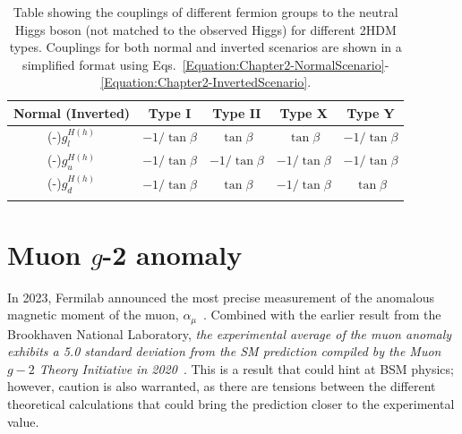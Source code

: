 \begin{table}[h]
\centering
\renewcommand{\arraystretch}{1.5} %
\setlength{\tabcolsep}{12pt} %
\begin{tabular}{|c|c|c|c|c|}
\hline
Normal (Inverted)     & Type I                     & Type II                     & Type X                                        & Type Y                      \\ \hline \hline
(-)$g_l^{H(h)}$ & $-1/\tan{\beta}$  & $\tan{\beta}$  & $\tan{\beta}$                    & $-1/\tan{\beta}$  \\ \arrayrulecolor{lightgray} \hline
(-)$g_u^{H(h)}$ & $-1/\tan{\beta}$  & $-1/\tan{\beta}$  & $-1/\tan{\beta}$                    & $-1/\tan{\beta}$  \\ \arrayrulecolor{lightgray} \hline
(-)$g_d^{H(h)}$ & $-1/\tan{\beta}$  & $\tan{\beta}$  & $-1/\tan{\beta}$                    & $\tan{\beta}$  \\ \arrayrulecolor{black} \hline
\end{tabular}
\caption[Neutral Higgs–fermion couplings for different 2HDM types]{Table showing the couplings of different fermion groups to the neutral Higgs boson (not matched to the observed Higgs) for different 2HDM types. Couplings for both normal and inverted scenarios are shown in a simplified format using Eqs.~\ref{Equation:Chapter2-NormalScenario}-\ref{Equation:Chapter2-InvertedScenario}.}
\label{Table:Chapter2_2HDM-CouplingsAlignmentLimit}
\end{table}

\section{\texorpdfstring{Muon $g$-2 anomaly}{Muon g-2 anomaly}}

In 2023, Fermilab announced the most precise measurement of the anomalous magnetic moment of the muon, $\alpha_\mu$~\cite{Fermilab_g-2}. Combined with the earlier result from the Brookhaven National Laboratory, \textit{the experimental average of the muon anomaly exhibits a 5.0 standard deviation from the SM prediction compiled by the Muon $g-2$ Theory Initiative in 2020}~\cite{Muon_Theory_Initiative}. This is a result that could hint at BSM physics; however, caution is also warranted, as there are tensions between the different theoretical calculations that could bring the prediction closer to the experimental value.


